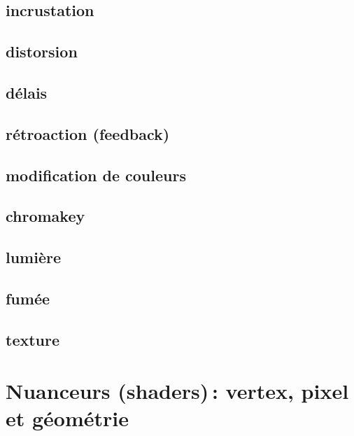 \documentclass[
]{book}
\begin{document}
\hypertarget{incrustation}{%
\subsection{incrustation}\label{incrustation}}

\hypertarget{distorsion}{%
\subsection{distorsion}\label{distorsion}}

\hypertarget{duxe9lais}{%
\subsection{délais}\label{duxe9lais}}

\hypertarget{ruxe9troaction-feedback}{%
\subsection{rétroaction (feedback)}\label{ruxe9troaction-feedback}}

\hypertarget{modification-de-couleurs}{%
\subsection{modification de couleurs}\label{modification-de-couleurs}}

\hypertarget{chromakey}{%
\subsection{chromakey}\label{chromakey}}

\hypertarget{lumiuxe8re}{%
\subsection{lumière}\label{lumiuxe8re}}

\hypertarget{fumuxe9e}{%
\subsection{fumée}\label{fumuxe9e}}

\hypertarget{texture-1}{%
\subsection{texture}\label{texture-1}}

\hypertarget{nuanceurs-shaders-vertex-pixel-et-guxe9omuxe9trie}{%
\section{Nuanceurs (shaders)\,: vertex, pixel et géométrie}\label{nuanceurs-shaders-vertex-pixel-et-guxe9omuxe9trie}}
\end{document}
